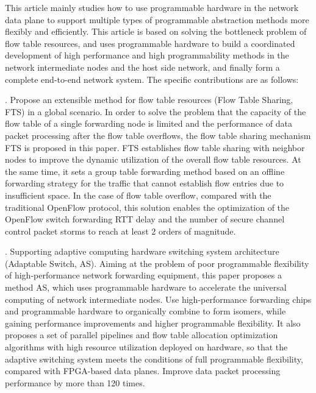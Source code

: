 \noindent This article mainly studies how to use programmable hardware in the network data plane to support multiple types of programmable abstraction methods more flexibly and efficiently.
This article is based on solving the bottleneck problem of flow table resources, and uses programmable hardware to build a coordinated development of high performance and high programmability methods in the network intermediate nodes and the host side network, and finally form a complete end-to-end network system.
The specific contributions are as follows:\newline


. Propose an extensible method for flow table resources (Flow Table Sharing, FTS) in a global scenario.
In order to solve the problem that the capacity of the flow table of a single forwarding node is limited and the performance of data packet processing after the flow table overflows, the flow table sharing mechanism FTS is proposed in this paper.
FTS establishes flow table sharing with neighbor nodes to improve the dynamic utilization of the overall flow table resources. At the same time, it sets a group table forwarding method based on an offline forwarding strategy for the traffic that cannot establish flow entries due to insufficient space.
In the case of flow table overflow, compared with the traditional OpenFlow protocol, this solution enables the optimization of the OpenFlow switch forwarding RTT delay and the number of secure channel control packet storms to reach at least 2 orders of magnitude.\newline

. Supporting adaptive computing hardware switching system architecture (Adaptable Switch, AS).
Aiming at the problem of poor programmable flexibility of high-performance network forwarding equipment, this paper proposes a method AS, which uses programmable hardware to accelerate the universal computing of network intermediate nodes.
Use high-performance forwarding chips and programmable hardware to organically combine to form isomers, while gaining performance improvements and higher programmable flexibility. It also proposes a set of parallel pipelines and flow table allocation optimization algorithms with high resource utilization deployed on hardware, so that the adaptive switching system meets the conditions of full programmable flexibility, compared with FPGA-based data planes. Improve data packet processing performance by more than 120 times.\newline

